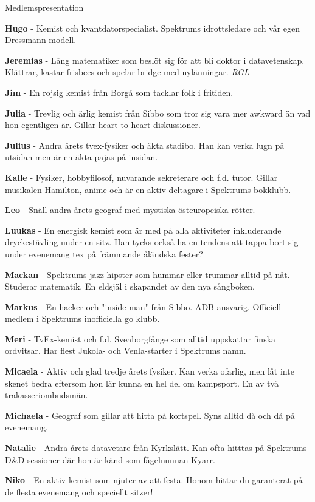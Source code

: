 \documentclass{spektraklet}
\begin{document}
\begin{artikel}{Medlemspresentation}{}
\begin{twocolumns}
\textbf{Hugo} - Kemist och kvantdatorspecialist. Spektrums idrottsledare och vår egen Dressmann modell.

\textbf{Jeremias} - Lång matematiker som beslöt sig för att bli doktor i datavetenskap. Klättrar, kastar frisbees och spelar bridge med nylänningar. \emph{RGL} %

\textbf{Jim} - En rojsig kemist från Borgå som tacklar folk i fritiden.

\textbf{Julia} - Trevlig och ärlig kemist från Sibbo som tror sig vara mer awkward än vad hon egentligen är. Gillar heart-to-heart diskussioner.

\textbf{Julius} - Andra årets tvex-fysiker och äkta stadibo. Han kan verka lugn på utsidan men är en äkta pajas på insidan.

\textbf{Kalle} - Fysiker, hobbyfilosof, nuvarande sekreterare och f.d. tutor. Gillar musikalen Hamilton, anime och är en aktiv deltagare i Spektrums bokklubb.

\textbf{Leo} - Snäll andra årets geograf med mystiska östeuropeiska rötter.

\textbf{Luukas} - En energisk kemist som är med på alla aktiviteter inkluderande dryckestävling under en sitz. Han tycks också ha en tendens att tappa bort sig under evenemang tex på främmande åländska fester?

\textbf{Mackan} - Spektrums jazz-hipster som hummar eller trummar alltid på nåt. Studerar matematik. En eldsjäl i skapandet av den nya sångboken.

\textbf{Markus} - En hacker och "inside-man" från Sibbo. ADB-ansvarig. Officiell medlem i Spektrums inofficiella go klubb.

\textbf{Meri} - TvEx-kemist och f.d. Sveaborgfånge som alltid uppskattar finska ordvitsar. Har flest Jukola- och Venla-starter i Spektrums namn. %

\textbf{Micaela} - Aktiv och glad tredje årets fysiker. Kan verka ofarlig, men låt inte skenet bedra eftersom hon lär kunna en hel del om kampsport. En av två trakasseriombudsmän.

\textbf{Michaela} - Geograf som gillar att hitta på kortspel. Syns alltid då och då på evenemang.

\textbf{Natalie} - Andra årets datavetare från Kyrkslätt. Kan ofta hitttas på Spektrums D\&D-sessioner där hon är känd som fågelnunnan Kyarr.

\textbf{Niko} - En aktiv kemist som njuter av att festa. Honom hittar du garanterat på de flesta evenemang och speciellt sitzer!


\end{twocolumns}
\end{artikel}
\end{document}
